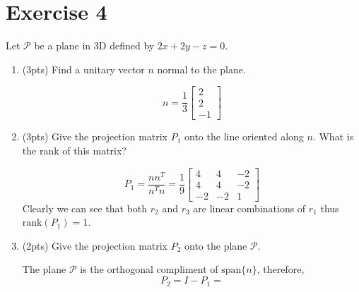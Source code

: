 \section{Exercise 4}
Let $\mathcal{P}$ be a plane in 3D defined by $2x+2y-z=0$.
\begin{enumerate}[label=(\alph*)]
    \item (3pts) Find a unitary vector $n$ normal to the plane.
        \begin{mdframed}[style=MyFrame]
            \begin{equation}
                n = \frac{1}{3}
                \begin{bmatrix}
                    2       \\
                    2       \\
                    -1
                \end{bmatrix}
            \end{equation}
        \end{mdframed}
    \item (3pts) Give the projection matrix $P_{1}$ onto the line oriented
        along $n$. What is the rank of this matrix?
        \begin{mdframed}[style=MyFrame]
            \begin{equation}
                P_{1}   = \frac{n n^{T}}{n^{T}n}
                        =
                        \frac{1}{9}
                        \begin{bmatrix}
                            4   &   4   &   -2  \\
                            4   &   4   &   -2  \\
                            -2  &   -2  &   1
                        \end{bmatrix}
            \end{equation}
            Clearly we can see that both $r_{2}$ and $r_{3}$ are linear
            combinations of $r_{1}$ thus $\text{rank}\left(P_{1}\right) =
            1$. 
        \end{mdframed}
    \item (2pts) Give the projection matrix $P_{2}$ onto the plane
        $\mathcal{P}$.
        \begin{mdframed}[style=MyFrame]
            The plane $\mathcal{P}$ is the orthogonal compliment of
            $\text{span}\{n\}$, therefore,
            \begin{equation}
                P_{2}   = 
                        I - P_{1} 
                        =

\end{equation}
\end{mdframed}
\end{enumerate}
